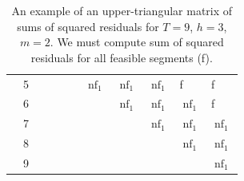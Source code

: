 \documentclass[main.tex]{subfiles}
\begin{document}
\begin{table}[]
\begin{tabular}{lllllllllll}
\multicolumn{1}{l|}{}              & \multicolumn{1}{l|}{5} & \multicolumn{1}{l|}{}     & \multicolumn{1}{l|}{}     & \multicolumn{1}{l|}{}     & \multicolumn{1}{l|}{}     & \multicolumn{1}{l|}{$\operatorname{nf}_1$} & \multicolumn{1}{l|}{$\operatorname{nf}_1$} & \multicolumn{1}{l|}{$\operatorname{nf}_1$} & \multicolumn{1}{l|}{f}   & \multicolumn{1}{l|}{f}   \\ \cline{2-11} 
\multicolumn{1}{l|}{}              & \multicolumn{1}{l|}{6} & \multicolumn{1}{l|}{}     & \multicolumn{1}{l|}{}     & \multicolumn{1}{l|}{}     & \multicolumn{1}{l|}{}     & \multicolumn{1}{l|}{}     & \multicolumn{1}{l|}{$\operatorname{nf}_1$} & \multicolumn{1}{l|}{$\operatorname{nf}_1$} & \multicolumn{1}{l|}{$\operatorname{nf}_1$} & \multicolumn{1}{l|}{f}   \\ \cline{2-11} 
\multicolumn{1}{l|}{}              & \multicolumn{1}{l|}{7} & \multicolumn{1}{l|}{}     & \multicolumn{1}{l|}{}     & \multicolumn{1}{l|}{}     & \multicolumn{1}{l|}{}     & \multicolumn{1}{l|}{}     & \multicolumn{1}{l|}{}     & \multicolumn{1}{l|}{$\operatorname{nf}_1$} & \multicolumn{1}{l|}{$\operatorname{nf}_1$} & \multicolumn{1}{l|}{$\operatorname{nf}_1$} \\ \cline{2-11} 
\multicolumn{1}{l|}{}              & \multicolumn{1}{l|}{8} & \multicolumn{1}{l|}{}     & \multicolumn{1}{l|}{}     & \multicolumn{1}{l|}{}     & \multicolumn{1}{l|}{}     & \multicolumn{1}{l|}{}     & \multicolumn{1}{l|}{}     & \multicolumn{1}{l|}{}     & \multicolumn{1}{l|}{$\operatorname{nf}_1$} & \multicolumn{1}{l|}{$\operatorname{nf}_1$} \\ \cline{2-11} 
\multicolumn{1}{l|}{}              & \multicolumn{1}{l|}{9} & \multicolumn{1}{l|}{}     & \multicolumn{1}{l|}{}     & \multicolumn{1}{l|}{}     & \multicolumn{1}{l|}{}     & \multicolumn{1}{l|}{}     & \multicolumn{1}{l|}{}     & \multicolumn{1}{l|}{}     & \multicolumn{1}{l|}{}     & \multicolumn{1}{l|}{$\operatorname{nf}_1$} \\ \cline{2-11} 
\end{tabular}
\caption{An example of an upper-triangular matrix of sums of squared residuals for $T =
  9$, $h=3$, $m=2$. We must compute sum of squared residuals for all feasible
  segments (f).
}
\label{table_4_1}
\end{table}
\end{document}
